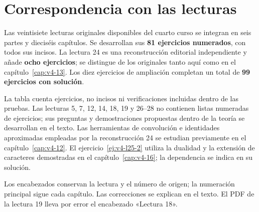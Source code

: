 \chapter{Correspondencia con las lecturas}
Las veintisiete lecturas originales disponibles del cuarto curso se integran en seis partes y dieciséis capítulos. Se desarrollan sus \textbf{81 ejercicios numerados}, con todos sus incisos. La lectura 24 es una reconstrucción editorial independiente y añade \textbf{ocho ejercicios}; se distingue de los originales tanto aquí como en el capítulo~\ref{cap:v4-13}. Los diez ejercicios de ampliación completan un total de \textbf{99 ejercicios con solución}.

La tabla cuenta ejercicios, no incisos ni verificaciones incluidas dentro de las pruebas. Las lecturas 5, 7, 12, 14, 18, 19 y 26--28 no contienen listas numeradas de ejercicios; sus preguntas y demostraciones propuestas dentro de la teoría se desarrollan en el texto. Las herramientas de convolución e identidades aproximadas empleadas por la reconstrucción 24 se estudian previamente en el capítulo~\ref{cap:v4-12}. El ejercicio~\ref{ej:v4-l25-2} utiliza la dualidad y la extensión de caracteres demostradas en el capítulo~\ref{cap:v4-16}; la dependencia se indica en su solución.

Los encabezados conservan la lectura y el número de origen; la numeración principal sigue cada capítulo. Las correcciones se explican en el texto. El PDF de la lectura 19 lleva por error el encabezado «Lectura 18».

